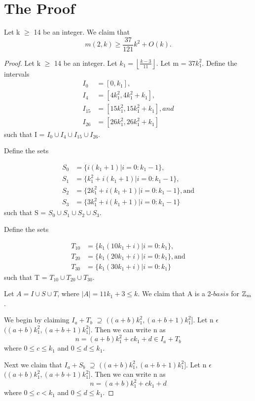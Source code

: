 \section{ The Proof}
\begin{theorem}
Let k $\geq$ 14 be an integer. We claim that
 \[
m(2,k) \geq \frac{37}{121}k^2 + O(k). 
\]
\end{theorem}
\begin{proof}
Let k $\geq$ 14 be an integer. Let $k_1 = \left \lfloor \frac{k - 3}{11} \right \rfloor$. Let m = $37k_1^2$.  Define the intervals
\begin{align*}
I_0 &= [0, k_1], \\
I_4 &= [4k_1^2, 4k_1^2+k_1], \\
I_{15} &= [15k_1^2, 15k_1^2+k_1], and \\
I_{26} &= [26k_1^2, 26k_1^2+k_1] 
\end{align*}
such that I = $I_0 \cup I_4 \cup I_{15} \cup I_{26}.$

Define the sets

\begin{align*}
S_0 &= \{i(k_1 + 1) | i = 0 : k_1 - 1\},\\
S_1 &= \{k_1^2 + i(k_1 + 1) | i = 0 : k_1 - 1\},\\
S_2 &= \{2k_1^2 + i(k_1 + 1) | i = 0 : k_1 - 1\}, \text{and}\\
S_3 &= \{3k_1^2 + i(k_1 + 1) | i = 0 : k_1 - 1\}
\end{align*}
such that S = $S_0 \cup S_1 \cup S_2 \cup S_3.$

Define the sets

\begin{align*}
T_{10} &= \{k_1(10k_1 + i) | i = 0 : k_1\},\\
T_{20} &= \{k_1(20k_1 + i) | i = 0 : k_1\}, \text{and}\\
T_{30} &= \{k_1(30k_1 + i) | i = 0 : k_1\}
\end{align*}
such that T = $T_{10} \cup T_{20} \cup T_{30} .$

Let $A = I \cup S \cup T$, where $|A| = 11k_1 + 3 \leq k$. We claim that A is a 2-$basis$ for $\mbox{$\mathbb Z$}_m$.

We begin by claiming $I_a + T_b$ $\supseteq$ $((a + b)k_1^2 ,  (a + b + 1)k_1^2]$. Let n $\epsilon$ $((a + b)k_1^2 ,  (a + b + 1)k_1^2]$.
Then we can write n as 
\[
n = (a + b) k_1^2 + ck_1 + d \in I_a + T_b
\]
where $0 \leq c \leq k_1$ and $0 \leq d \leq k_1$. 

Next we claim that  $I_a + S_b$ $\supseteq$ $((a + b)k_1^2 ,  (a + b + 1)k_1^2]$. Let n $\epsilon$ $((a + b)k_1^2 ,  (a + b + 1)k_1^2]$.
Then we can write n as 
\[
n = (a + b) k_1^2 + ck_1 + d 
\]
where  $0 \leq c < k_1$ and $0 \leq d \leq k_1$. 


\end{proof}
